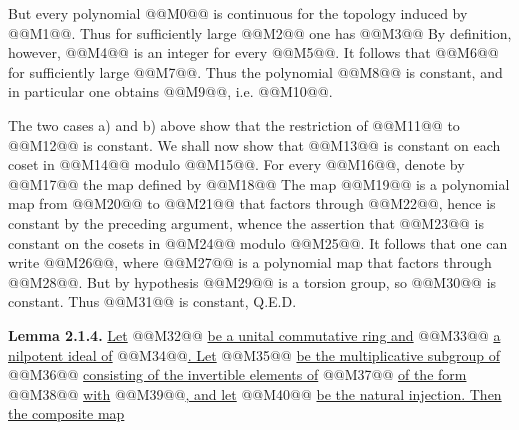 
But every polynomial @@M0@@ is continuous for the topology induced by @@M1@@. Thus for sufficiently large @@M2@@ one has
@@M3@@
By definition, however, @@M4@@ is an integer for every @@M5@@. It follows that @@M6@@ for sufficiently large @@M7@@. Thus the polynomial @@M8@@ is constant, and in particular one obtains @@M9@@, i.e. @@M10@@.

The two cases a) and b) above show that the restriction of @@M11@@ to @@M12@@ is constant. We shall now show that @@M13@@ is constant on each coset in @@M14@@ modulo @@M15@@. For every @@M16@@, denote by @@M17@@ the map defined by
@@M18@@
The map @@M19@@ is a polynomial map from @@M20@@ to @@M21@@ that factors through @@M22@@, hence is constant by the preceding argument, whence the assertion that @@M23@@ is constant on the cosets in @@M24@@ modulo @@M25@@. It follows that one can write @@M26@@, where @@M27@@ is a polynomial map that factors through @@M28@@. But by hypothesis @@M29@@ is a torsion group, so @@M30@@ is constant. Thus @@M31@@ is constant, Q.E.D.

\textbf{Lemma 2.1.4.} \uline{Let} @@M32@@ \uline{be a unital commutative ring and} @@M33@@ \uline{a nilpotent ideal of} @@M34@@\uline{. Let} @@M35@@ \uline{be the multiplicative subgroup of} @@M36@@ \uline{consisting of the invertible elements of} @@M37@@ \uline{of the form} @@M38@@ \uline{with} @@M39@@\uline{, and let} @@M40@@ \uline{be the natural injection. Then the composite map}

